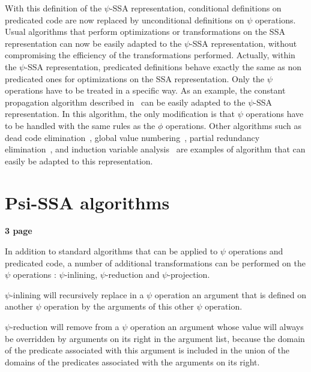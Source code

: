 
With this definition of the $\psi$-SSA representation, conditional
definitions on predicated code are now replaced by unconditional
definitions on $\psi$ operations. Usual algorithms that perform
optimizations or transformations on the SSA representation can now be
easily adapted to the $\psi$-SSA representation, without compromising
the efficiency of the transformations performed. Actually, within the
$\psi$-SSA representation, predicated definitions behave exactly the
same as non predicated ones for optimizations on the SSA
representation. Only the $\psi$ operations have to be treated in a
specific way. As an example, the constant propagation algorithm
described in~\cite{WZ91} can be easily adapted to the $\psi$-SSA
representation. In this algorithm, the only modification is that
$\psi$ operations have to be handled with the same rules as the $\phi$
operations. Other algorithms such as dead code
elimination~\cite{morgan98}, global value numbering~\cite{Cli95},
partial redundancy elimination~\cite{CCK+97}, and induction variable
analysis~\cite{Wolfe92} are examples of algorithm that can easily be
adapted to this representation.

\section{Psi-SSA algorithms}

\textbf{3 page}


In addition to standard algorithms that can be applied to $\psi$
operations and predicated code, a number of additional transformations
can be performed on the $\psi$ operations : $\psi$-inlining,
$\psi$-reduction and $\psi$-projection.

$\psi$-inlining will recursively replace in a $\psi$ operation an
argument that is defined on another $\psi$ operation by the arguments
of this other $\psi$ operation.

$\psi$-reduction will remove from a $\psi$ operation an argument whose
value will always be overridden by arguments on its right in the
argument list, because the domain of the predicate associated with
this argument is included in the union of the domains of the
predicates associated with the arguments on its right.

